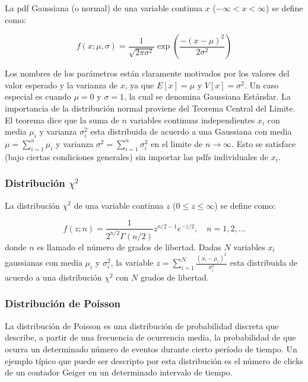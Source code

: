 La pdf Gaussiana (o normal) de una variable continua $x$ ($-\infty < x < \infty$)
se define como:

\begin{equation}
  f(x;\mu,\sigma) = \frac{1}{\sqrt{2\pi \sigma^2}} \exp \left( \frac{-(x-\mu)^2}{2\sigma^2} \right)
\end{equation}

Los nombres de los parámetros están claramente motivados por los valores del
valor esperado y la varianza de $x$, ya que $E[x] = \mu$ y $V[x] = \sigma^2$. Un
caso especial es cuando $\mu=0$ y $\sigma=1$, la cual se denomina Gaussiana
Estándar.
La importancia de la distribución normal proviene del Teorema Central del
Limite. El teorema dice que la suma de $n$ variables continuas independientes
$x_i$ con media $\mu_i$ y varianza $\sigma_i^2$ esta distribuida de acuerdo a
una Gaussiana con media $\mu = \sum_{i=1}^n \mu_i$ y varianza $\sigma^2 =
\sum_{i=1}^n \sigma_i^2$ en el limite de $n\to\infty$. Esto se satisface (bajo
ciertas condiciones generales) sin importar las pdfs individuales de $x_i$.


\subsubsection{Distribución $\chi^2$}

La distribución $\chi^2$ de una variable continua $z$ ($0 \leq z \leq \infty$) se
define como:

\begin{equation}
  f(z;n) = \frac{1}{2^{n/2}\Gamma(n/2)} z^{n/2-1} e^{-z/2}, \quad n=1,2,\ldots
\end{equation}
%
donde $n$ es llamado el número de grados de libertad.
Dadas $N$ variables $x_i$ gaussianas con media $\mu_i$ y $\sigma_i^2$, la
variable $z = \sum_{i=1}^{N} \frac{(x_i-\mu_i)^2}{\sigma_i^2}$ esta distribuida
de acuerdo a una distribución $\chi^2$ con $N$ grados de libertad.


\subsubsection{Distribución de Poisson}

La distribución de Poisson es una distribución de probabilidad discreta que
describe, a partir de una frecuencia de ocurrencia media, la probabilidad de que
ocurra un determinado número de eventos durante cierto período de tiempo. Un
ejemplo típico que puede ser descripto por esta distribución es el número de
clicks de un contador Geiger en un determinado intervalo de tiempo.

